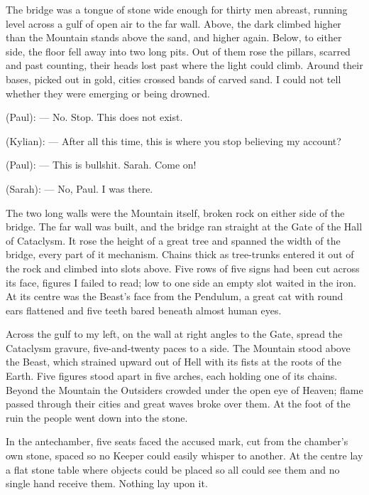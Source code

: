 The bridge was a tongue of stone wide enough for thirty men abreast, running level across a gulf of open air to the far wall. Above, the dark climbed higher than the Mountain stands above the sand, and higher again. Below, to either side, the floor fell away into two long pits. Out of them rose the pillars, scarred and past counting, their heads lost past where the light could climb. Around their bases, picked out in gold, cities crossed bands of carved sand. I could not tell whether they were emerging or being drowned.\par

\begin{room}

(Paul): --- No. Stop. This does not exist.

(Kylian): --- After all this time, this is where you stop believing my account?

(Paul): --- This is bullshit. Sarah. Come on!

(Sarah): --- No, Paul. I was there.

\end{room}

The two long walls were the Mountain itself, broken rock on either side of the bridge. The far wall was built, and the bridge ran straight at the Gate of the Hall of Cataclysm. It rose the height of a great tree and spanned the width of the bridge, every part of it mechanism. Chains thick as tree-trunks entered it out of the rock and climbed into slots above. Five rows of five signs had been cut across its face, figures I failed to read; low to one side an empty slot waited in the iron. At its centre was the Beast's face from the Pendulum, a great cat with round ears flattened and five teeth bared beneath almost human eyes.\par

Across the gulf to my left, on the wall at right angles to the Gate, spread the Cataclysm gravure, five-and-twenty paces to a side. The Mountain stood above the Beast, which strained upward out of Hell with its fists at the roots of the Earth. Five figures stood apart in five arches, each holding one of its chains. Beyond the Mountain the Outsiders crowded under the open eye of Heaven; flame passed through their cities and great waves broke over them. At the foot of the ruin the people went down into the stone.\par

In the antechamber, five seats faced the accused mark, cut from the chamber's own stone, spaced so no Keeper could easily whisper to another. At the centre lay a flat stone table where objects could be placed so all could see them and no single hand receive them. Nothing lay upon it.\par

